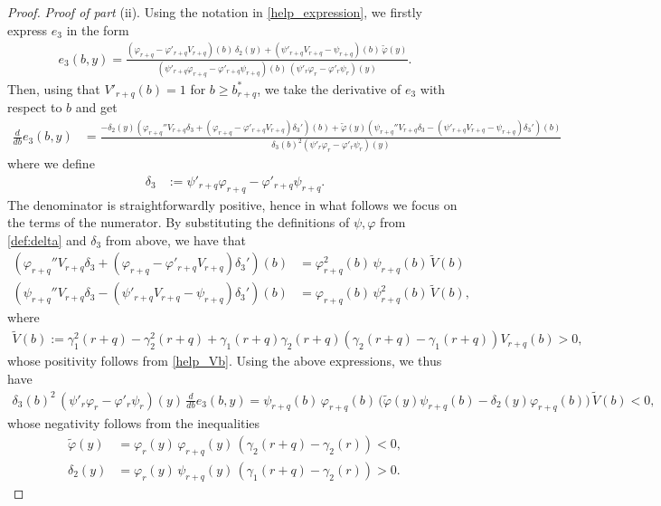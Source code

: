 \documentclass[11pt]{article} %
\renewcommand{\phi}{\varphi}
\numberwithin{komcounter}{section}
\numberwithin{equation}{section}
\numberwithin{theorem}{section}
\begin{document}
\begin{proof}
\vspace{1mm}
{\it Proof of part} (ii).
Using the notation in \eqref{help_expression}, we firstly express $e_3$ in the form
\begin{align*}
e_3(b,y) 
= \frac{(\phi_{r+q}-\phi'_{r+q}V_{r+q})(b) \, \delta_2(y) + (\psi'_{r+q}V_{r+q}-\psi_{r+q})(b) \, \tilde\phi(y)}{(\psi'_{r+q}\phi_{r+q}-\phi'_{r+q}\psi_{r+q})(b) \, (\psi'_{r}\phi_r-\phi'_{r}\psi_{r})(y)}.
\end{align*}
Then, using that $V'_{r+q}(b)=1$ for $b\geq b_{r+q}^*$, we take the derivative of $e_3$ with respect to $b$ and get
\begin{align*}
\frac{d}{db}e_3(b,y) 
&= \frac{-\delta_2(y)(\phi_{r+q}''V_{r+q}\delta_3+(\phi_{r+q}-\phi'_{r+q}V_{r+q})\delta_3')(b)+\tilde\phi(y)(\psi_{r+q}''V_{r+q}\delta_3 -(\psi'_{r+q}V_{r+q}-\psi_{r+q})\delta_3')(b)}{\delta_3(b)^2(\psi'_{r}\phi_r-\phi'_{r}\psi_{r})(y)} 
\end{align*}
where we define 
\begin{align*}
\delta_3 &:= \psi'_{r+q}\phi_{r+q}-\phi'_{r+q}\psi_{r+q}. 
\end{align*}
The denominator is straightforwardly positive, hence in what follows we focus on the terms of the numerator.
By substituting the definitions of $\psi,\phi$ from \eqref{def:delta} and $\delta_3$ from above, we have that
\begin{align*}
(\phi_{r+q}'' V_{r+q} \delta_3 + (\phi_{r+q} - \phi'_{r+q} V_{r+q}) \delta_3')(b) 
&= \phi_{r+q}^2(b) \, \psi_{r+q}(b) \, \widetilde{V}(b)\\
(\psi_{r+q}''V_{r+q}\delta_3 - (\psi'_{r+q}V_{r+q}-\psi_{r+q})\delta_3')(b) 
&= \phi_{r+q}(b) \, \psi_{r+q}^2(b) \, \widetilde{V}(b),
\end{align*}
where
\begin{align*}
\widetilde{V}(b):=\gamma_1^2(r+q)-\gamma_2^2(r+q)+\gamma_1(r+q)\gamma_2(r+q)(\gamma_2(r+q)-\gamma_1(r+q))V_{r+q}(b) > 0,
\end{align*}
whose positivity follows from \eqref{help_Vb}.
Using the above expressions, we thus have \begin{align*}
\delta_3(b)^2 \, (\psi'_{r}\phi_r-\phi'_{r}\psi_{r})(y) \, \frac{d}{db}e_3(b,y) 
= \psi_{r+q}(b) \, \phi_{r+q}(b) \, \big(\tilde\phi(y)\psi_{r+q}(b)-\delta_2(y)\phi_{r+q}(b) \big) \, \tilde{V}(b) < 0,
\end{align*}
whose negativity follows from the inequalities 
\begin{align*}
\tilde{\phi}(y) &= \phi_r(y) \, \phi_{r+q}(y) \, (\gamma_2(r+q)-\gamma_2(r)) < 0 ,\\
\delta_2(y) &= \phi_r(y) \, \psi_{r+q}(y) \, (\gamma_1(r+q) - \gamma_2(r)) > 0 .
\end{align*}
 

\end{proof}
\end{document}

